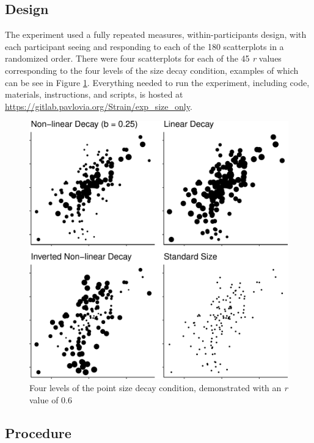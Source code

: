 \documentclass{vgtc}                          %
\begin{document}
\hypertarget{design}{%
\subsection{Design}\label{design}}

The experiment used a fully repeated measures, within-participants design, with each
participant seeing and responding to each of the 180 scatterplots in a randomized order.
There were four scatterplots for each of the 45 \emph{r} values corresponding to the
four levels of the size decay condition, examples of which can be see in Figure \ref{fig:examples}.
Everything needed to run the experiment, including code, materials, instructions, and scripts, is
hosted at \url{https://gitlab.pavlovia.org/Strain/exp_size_only}.

\begin{figure}
\includegraphics[width=1\linewidth]{size_and_scatterplots_files/figure-latex/examples-1} \caption{Four levels of the point size decay condition, demonstrated with an \textit{r} value of 0.6}\label{fig:examples}
\end{figure}

\hypertarget{procedure}{%
\subsection{Procedure}\label{procedure}}
\end{document}
